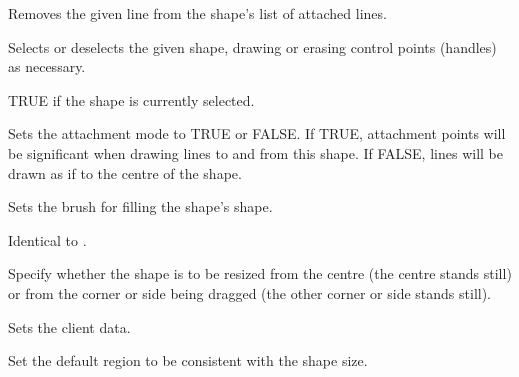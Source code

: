 Removes the given line from the shape's list of attached lines.

\label{wxshapeselect}


Selects or deselects the given shape, drawing or erasing control points
(handles) as necessary.

\label{wxshapeselected}


TRUE if the shape is currently selected.

\label{wxshapesetattachmentmode}


Sets the attachment mode to TRUE or FALSE. If TRUE, attachment points
will be significant when drawing lines to and from this shape.
If FALSE, lines will be drawn as if to the centre of the shape.



Sets the brush for filling the shape's shape.

\label{wxshapesetcanvas}


Identical to .



Specify whether the shape is to be resized from the centre (the centre stands still) or from the corner or side
being dragged (the other corner or side stands still).



Sets the client data.

\label{setdefaultregionsize}


Set the default region to be consistent with the shape size.

